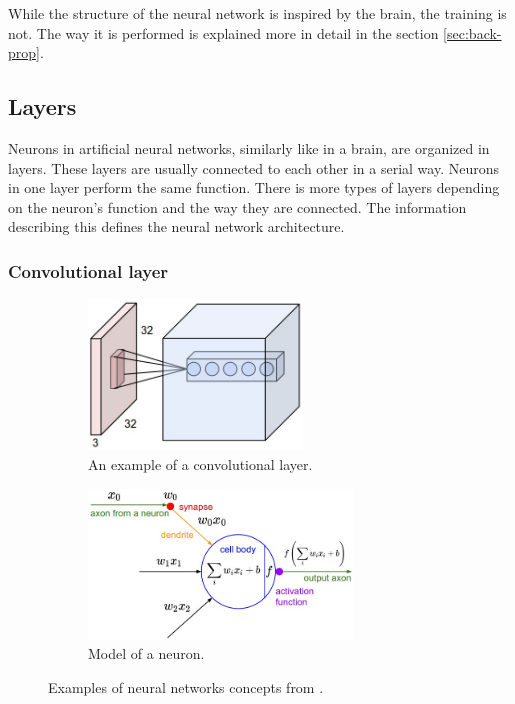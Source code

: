 \documentclass[a4paper,12pt,titlepage, twoside]{article}
\numberwithin{figure}{section}
\begin{document}
While the structure of the neural network is inspired by the brain, the training is not. The way it is performed is explained more in detail in the section \ref{sec:back-prop}.

\subsection{Layers}
Neurons in artificial neural networks, similarly like in a brain, are organized in layers. These layers are usually connected to each other in a serial way. Neurons in one layer perform the same function. There is more types of layers depending on the neuron's function and the way they are connected. The information describing this defines the neural network architecture.


\subsubsection{Convolutional layer}

\begin{figure}[h!]
    \begin{subfigure}[Sample1]{0.5\linewidth}
    	\includegraphics[height=40mm]{fig/conv1.jpeg} 
        \caption{An example of a convolutional layer.}
        \label{fig:conv_layer}   
    \end{subfigure}
    \qquad
    \begin{subfigure}[Sample1]{0.5\linewidth} 
    	\includegraphics[height=40mm]{fig/conv2.jpeg}
        \caption{Model of a neuron.}   
        \label{fig:neuron}
    \end{subfigure} 
    \caption{Examples of neural networks concepts from \cite{karpathy2016cs231n}.}
\end{figure}
\end{document}
